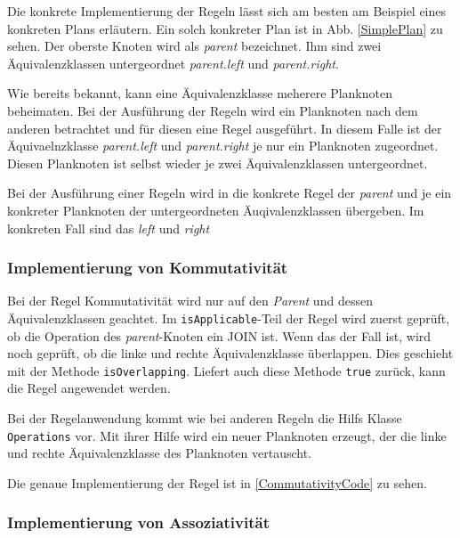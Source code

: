 Die konkrete Implementierung der Regeln lässt sich am besten am Beispiel eines konkreten Plans erläutern. Ein solch konkreter Plan ist in Abb. \ref{SimplePlan} zu sehen. Der oberste Knoten wird als \textit{parent} bezeichnet. Ihm sind zwei Äquivalenzklassen untergeordnet \textit{parent.left} und \textit{parent.right}. 

Wie bereits bekannt, kann eine Äquivalenzklasse meherere Planknoten beheimaten. Bei der Ausführung der Regeln wird ein Planknoten nach dem anderen betrachtet und für diesen eine Regel ausgeführt. In diesem Falle ist der Äquivaelnzklasse \textit{parent.left} und \textit{parent.right} je nur ein Planknoten zugeordnet. Diesen Planknoten ist selbst wieder je zwei Äquivalenzklassen untergeordnet.


Bei der Ausführung einer Regeln wird in die konkrete Regel der \textit{parent} und je ein konkreter Planknoten der untergeordneten Äuqivalenzklassen übergeben. Im konkreten Fall sind das \textit{left} und \textit{right}





\subsubsection{Implementierung von Kommutativität}

Bei der Regel Kommutativität wird nur auf den \textit{Parent} und dessen Äquivalenzklassen geachtet. Im \texttt{isApplicable}-Teil der Regel wird zuerst geprüft, ob die Operation des \textit{parent}-Knoten ein JOIN ist. Wenn das der Fall ist, wird noch geprüft, ob die linke und rechte Äquivalenzklasse überlappen. Dies geschieht mit der Methode \texttt{isOverlapping}. Liefert auch diese Methode \texttt{true} zurück, kann die Regel angewendet werden.

Bei der Regelanwendung kommt wie bei anderen Regeln die Hilfs Klasse \texttt{Operations} vor. Mit ihrer Hilfe wird ein neuer Planknoten erzeugt, der die linke und rechte Äquivalenzklasse des Planknoten vertauscht.

Die genaue Implementierung der Regel ist in \ref{CommutativityCode} zu sehen.





\subsubsection{Implementierung von Assoziativität}

